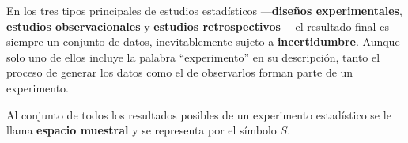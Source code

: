 En los tres tipos principales de estudios estadísticos —\textbf{diseños experimentales}, \textbf{estudios observacionales} y \textbf{estudios retrospectivos}— el resultado final es siempre un conjunto de datos, inevitablemente sujeto a \textbf{incertidumbre}. Aunque solo uno de ellos incluye la palabra ``experimento'' en su descripción, tanto el proceso de generar los datos como el de observarlos forman parte de un experimento.

\begin{definition}
    Al conjunto de todos los resultados posibles de un experimento estadístico se le llama \textbf{espacio muestral} y se representa por el símbolo $S$.
\end{definition}
